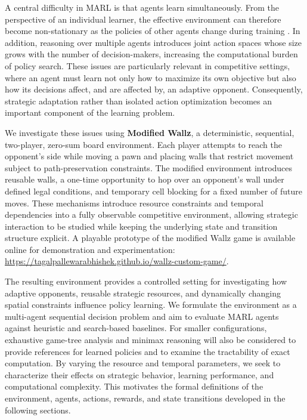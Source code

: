 \documentclass{article}
\begin{document}
A central difficulty in MARL is that agents learn simultaneously. From the perspective of an individual learner, the effective environment can therefore become non-stationary as the policies of other agents change during training \cite{gronauer2022multiagent,zhang2020multiagent}. In addition, reasoning over multiple agents introduces joint action spaces whose size grows with the number of decision-makers, increasing the computational burden of policy search. These issues are particularly relevant in competitive settings, where an agent must learn not only how to maximize its own objective but also how its decisions affect, and are affected by, an adaptive opponent. Consequently, strategic adaptation rather than isolated action optimization becomes an important component of the learning problem.

We investigate these issues using \textbf{Modified Wallz}, a deterministic, sequential, two-player, zero-sum board environment. Each player attempts to reach the opponent's side while moving a pawn and placing walls that restrict movement subject to path-preservation constraints. The modified environment introduces reusable walls, a one-time opportunity to hop over an opponent's wall under defined legal conditions, and temporary cell blocking for a fixed number of future moves. These mechanisms introduce resource constraints and temporal dependencies into a fully observable competitive environment, allowing strategic interaction to be studied while keeping the underlying state and transition structure explicit. A playable prototype of the modified Wallz game is available online for demonstration and experimentation: \url{https://tagalpallewarabhishek.github.io/wallz-custom-game/}.

The resulting environment provides a controlled setting for investigating how adaptive opponents, reusable strategic resources, and dynamically changing spatial constraints influence policy learning. We formulate the environment as a multi-agent sequential decision problem and aim to evaluate MARL agents against heuristic and search-based baselines. For smaller configurations, exhaustive game-tree analysis and minimax reasoning will also be considered to provide references for learned policies and to examine the tractability of exact computation. By varying the resource and temporal parameters, we seek to characterize their effects on strategic behavior, learning performance, and computational complexity. This motivates the formal definitions of the environment, agents, actions, rewards, and state transitions developed in the following sections.
\end{document}
